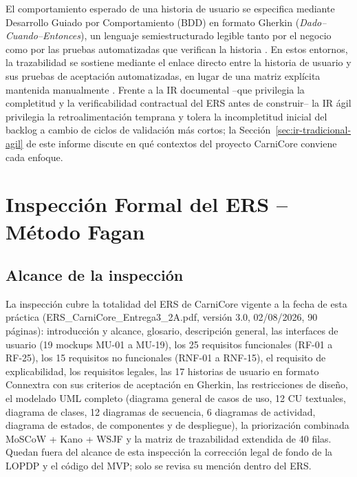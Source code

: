 \documentclass[11pt,a4paper]{article}
\begin{document}
El comportamiento esperado de una historia de usuario se especifica mediante Desarrollo Guiado por Comportamiento (BDD) en formato Gherkin (\textit{Dado--Cuando--Entonces}), un lenguaje semiestructurado legible tanto por el negocio como por las pruebas automatizadas que verifican la historia \cite{smart2014bdd}. En estos entornos, la trazabilidad se sostiene mediante el enlace directo entre la historia de usuario y sus pruebas de aceptación automatizadas, en lugar de una matriz explícita mantenida manualmente \cite{smart2014bdd,clelandhuang2012traceability}. Frente a la IR documental --que privilegia la completitud y la verificabilidad contractual del ERS antes de construir-- la IR ágil privilegia la retroalimentación temprana y tolera la incompletitud inicial del backlog a cambio de ciclos de validación más cortos; la Sección~\ref{sec:ir-tradicional-agil} de este informe discute en qué contextos del proyecto CarniCore conviene cada enfoque.

\section{Inspección Formal del ERS -- Método Fagan}

\subsection{Alcance de la inspección}
La inspección cubre la totalidad del ERS de CarniCore vigente a la fecha de esta práctica (ERS\_CarniCore\_Entrega3\_2A.pdf, versión 3.0, 02/08/2026, 90 páginas): introducción y alcance, glosario, descripción general, las interfaces de usuario (19 mockups MU-01 a MU-19), los 25 requisitos funcionales (RF-01 a RF-25), los 15 requisitos no funcionales (RNF-01 a RNF-15), el requisito de explicabilidad, los requisitos legales, las 17 historias de usuario en formato Connextra con sus criterios de aceptación en Gherkin, las restricciones de diseño, el modelado UML completo (diagrama general de casos de uso, 12 CU textuales, diagrama de clases, 12 diagramas de secuencia, 6 diagramas de actividad, diagrama de estados, de componentes y de despliegue), la priorización combinada MoSCoW + Kano + WSJF y la matriz de trazabilidad extendida de 40 filas. Quedan fuera del alcance de esta inspección la corrección legal de fondo de la LOPDP y el código del MVP; solo se revisa su mención dentro del ERS.
\end{document}
